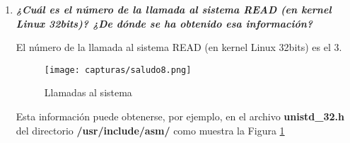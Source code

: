 \begin{enumerate}
	\item \textbf{\textit{¿Cuál es el número de la llamada al sistema READ (en kernel Linux 32bits)? ¿De dónde se ha obtenido esa información?}}
	
	El número de la llamada al sistema READ (en kernel Linux 32bits) es el 3.	
	\begin{figure}[H] %
		\centering
		\texttt{[image: capturas/saludo8.png]}  
		\caption{Llamadas al sistema} 
		\label{fig:figura8}
	\end{figure}
	Esta información puede obtenerse, por ejemplo, en el archivo \textbf{unistd\_32.h} del directorio \textbf{/usr/include/asm/} como muestra la Figura \ref{fig:figura8}
		 
\end{enumerate}


